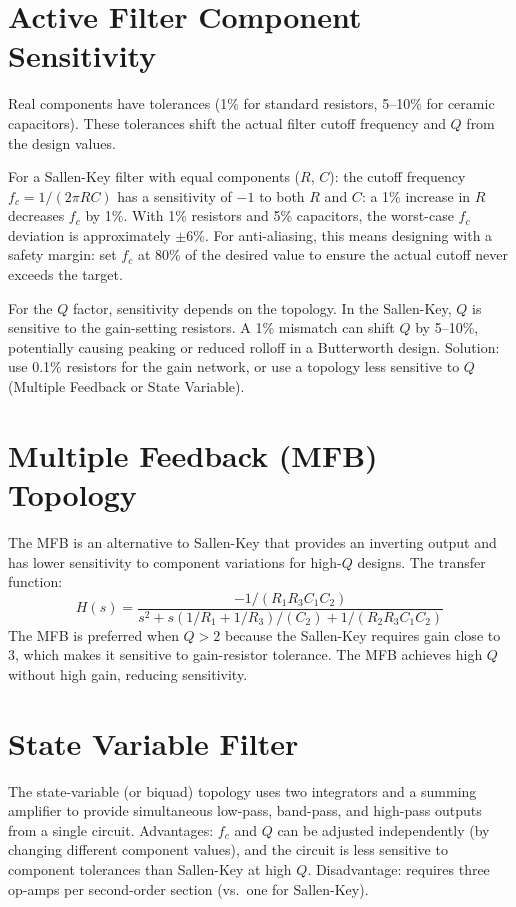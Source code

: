\documentclass[11pt,letterpaper,twoside,openany]{book}
\begin{document}
\section{Active Filter Component Sensitivity}
Real components have tolerances (1\% for standard resistors, 5--10\% for ceramic capacitors). These tolerances shift the actual filter cutoff frequency and $Q$ from the design values.

For a Sallen-Key filter with equal components ($R$, $C$): the cutoff frequency $f_c = 1/(2\pi RC)$ has a sensitivity of $-1$ to both $R$ and $C$: a 1\% increase in $R$ decreases $f_c$ by 1\%. With 1\% resistors and 5\% capacitors, the worst-case $f_c$ deviation is approximately $\pm$6\%. For anti-aliasing, this means designing with a safety margin: set $f_c$ at 80\% of the desired value to ensure the actual cutoff never exceeds the target.

For the $Q$ factor, sensitivity depends on the topology. In the Sallen-Key, $Q$ is sensitive to the gain-setting resistors. A 1\% mismatch can shift $Q$ by 5--10\%, potentially causing peaking or reduced rolloff in a Butterworth design. Solution: use 0.1\% resistors for the gain network, or use a topology less sensitive to $Q$ (Multiple Feedback or State Variable).

\section{Multiple Feedback (MFB) Topology}
The MFB is an alternative to Sallen-Key that provides an inverting output and has lower sensitivity to component variations for high-$Q$ designs. The transfer function:
\begin{equation}
H(s) = \frac{-1/(R_1 R_3 C_1 C_2)}{s^2 + s(1/R_1 + 1/R_3)/(C_2) + 1/(R_2 R_3 C_1 C_2)}
\end{equation}
The MFB is preferred when $Q > 2$ because the Sallen-Key requires gain close to 3, which makes it sensitive to gain-resistor tolerance. The MFB achieves high $Q$ without high gain, reducing sensitivity.

\section{State Variable Filter}
The state-variable (or biquad) topology uses two integrators and a summing amplifier to provide simultaneous low-pass, band-pass, and high-pass outputs from a single circuit. Advantages: $f_c$ and $Q$ can be adjusted independently (by changing different component values), and the circuit is less sensitive to component tolerances than Sallen-Key at high $Q$. Disadvantage: requires three op-amps per second-order section (vs.\ one for Sallen-Key).
\end{document}
